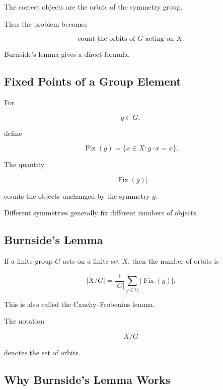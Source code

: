 The correct objects are the orbits of the symmetry group.

Thus the problem becomes

\[
\boxed{
\text{count the orbits of }G\text{ acting on }X.
}
\]

Burnside's lemma gives a direct formula.

\subsection{Fixed Points of a Group Element}
\label{subsec:fixed-points-group-action}

For

\[
g\in G,
\]

define

\[
\boxed{
\operatorname{Fix}(g)
=
\{x\in X:g\cdot x=x\}.
}
\]

The quantity

\[
|\operatorname{Fix}(g)|
\]

counts the objects unchanged by the symmetry \(g\).

Different symmetries generally fix different numbers of objects.

\subsection{Burnside's Lemma}
\label{subsec:burnsides-lemma}

\begin{theorem}
If a finite group \(G\) acts on a finite set \(X\), then the number of
orbits is

\[
\boxed{
|X/G|
=
\frac{1}{|G|}
\sum_{g\in G}
|\operatorname{Fix}(g)|.
}
\]
\end{theorem}

This is also called the Cauchy--Frobenius lemma.

The notation

\[
X/G
\]

denotes the set of orbits.

\subsection{Why Burnside's Lemma Works}
\label{subsec:why-burnside-works}

